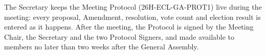 \documentclass{../../../Common/Latex/Templates/rapport}
\begin{document}
The Secretary keeps the Meeting Protocol (26H-ECL-GA-PROT1) live during the meeting: every proposal, Amendment, resolution, vote count and election result is entered as it happens. After the meeting, the Protocol is signed by the Meeting Chair, the Secretary and the two Protocol Signers, and made available to members no later than two weeks after the General Assembly.
\end{document}
